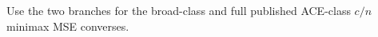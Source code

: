 Use the two branches for the broad-class and full published ACE-class \(c/n\) minimax MSE converses.